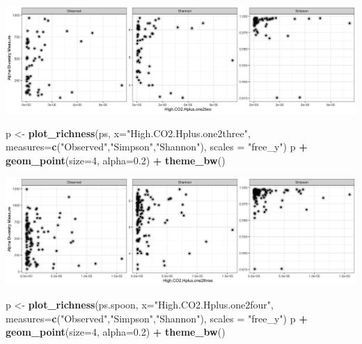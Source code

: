 \documentclass[]{article}
\newenvironment{Shaded}{\begin{snugshade}}{\end{snugshade}}
\newcommand{\DataTypeTok}[1]{\textcolor[rgb]{0.13,0.29,0.53}{#1}}
\newcommand{\DecValTok}[1]{\textcolor[rgb]{0.00,0.00,0.81}{#1}}
\newcommand{\FloatTok}[1]{\textcolor[rgb]{0.00,0.00,0.81}{#1}}
\newcommand{\KeywordTok}[1]{\textcolor[rgb]{0.13,0.29,0.53}{\textbf{#1}}}
\newcommand{\NormalTok}[1]{#1}
\newcommand{\OperatorTok}[1]{\textcolor[rgb]{0.81,0.36,0.00}{\textbf{#1}}}
\newcommand{\StringTok}[1]{\textcolor[rgb]{0.31,0.60,0.02}{#1}}
\begin{document}
\includegraphics{output-rmd/richness-ph-High.CO2.Hplus.one2two.spoon-1.png}

\begin{Shaded}
\begin{Highlighting}[]
\NormalTok{p <-}\StringTok{ }\KeywordTok{plot_richness}\NormalTok{(ps, }\DataTypeTok{x=}\StringTok{"High.CO2.Hplus.one2three"}\NormalTok{, }\DataTypeTok{measures=}\KeywordTok{c}\NormalTok{(}\StringTok{"Observed"}\NormalTok{,}\StringTok{"Simpson"}\NormalTok{,}\StringTok{"Shannon"}\NormalTok{), }\DataTypeTok{scales =} \StringTok{"free_y"}\NormalTok{)}
\NormalTok{p }\OperatorTok{+}\StringTok{ }\KeywordTok{geom_point}\NormalTok{(}\DataTypeTok{size=}\DecValTok{4}\NormalTok{, }\DataTypeTok{alpha=}\FloatTok{0.2}\NormalTok{) }\OperatorTok{+}\StringTok{ }\KeywordTok{theme_bw}\NormalTok{()}
\end{Highlighting}
\end{Shaded}

\includegraphics{output-rmd/richness-ph-High.CO2.Hplus.one2three-1.png}

\begin{Shaded}
\begin{Highlighting}[]
\NormalTok{p <-}\StringTok{ }\KeywordTok{plot_richness}\NormalTok{(ps.spoon, }\DataTypeTok{x=}\StringTok{"High.CO2.Hplus.one2four"}\NormalTok{, }\DataTypeTok{measures=}\KeywordTok{c}\NormalTok{(}\StringTok{"Observed"}\NormalTok{,}\StringTok{"Simpson"}\NormalTok{,}\StringTok{"Shannon"}\NormalTok{), }\DataTypeTok{scales =} \StringTok{"free_y"}\NormalTok{)}
\NormalTok{p }\OperatorTok{+}\StringTok{ }\KeywordTok{geom_point}\NormalTok{(}\DataTypeTok{size=}\DecValTok{4}\NormalTok{, }\DataTypeTok{alpha=}\FloatTok{0.2}\NormalTok{) }\OperatorTok{+}\StringTok{ }\KeywordTok{theme_bw}\NormalTok{()}
\end{Highlighting}
\end{Shaded}
\end{document}
